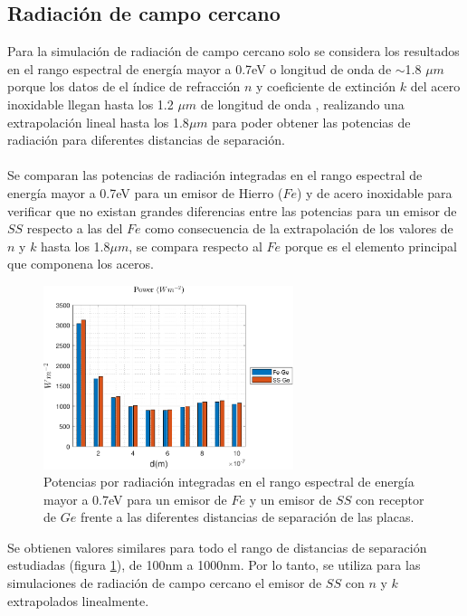 \subsection{Radiación de campo cercano}
Para la simulación de radiación de campo cercano solo se considera los resultados en el rango espectral de energía mayor a 0.7eV o longitud de onda de $\sim$1.8 $\mu m$ porque los datos de el índice de refracción $n$ y coeficiente de extinción $k$ del acero inoxidable llegan hasta los 1.2 $\mu m$ de longitud de onda \cite{ss_optical_2017}, realizando una extrapolación lineal hasta los 1.8$\mu m$ para poder obtener las potencias de radiación para diferentes distancias de separación.\\\\
Se comparan las potencias de radiación integradas en el rango espectral de energía mayor a 0.7eV para un emisor de Hierro ($Fe$) y de acero inoxidable para verificar que no existan grandes diferencias entre las potencias para un emisor de $SS$ respecto a las del $Fe$ como consecuencia de la extrapolación de los valores de $n$ y $k$ hasta los 1.8$\mu m$, se compara respecto al $Fe$ porque es el elemento principal que componena  los aceros.
\begin{figure}[H]
	\centering
		\includegraphics[width=0.65\textwidth]{figuras/rad_mat/FevsSs.pdf}
	\caption{Potencias por radiación integradas en el rango espectral de energía mayor a 0.7eV para un emisor de $Fe$ y un emisor de $SS$ con receptor de $Ge$ frente a las diferentes distancias de separación de las placas.}
	\label{fig:FevsSs}
\end{figure}
Se obtienen valores similares para todo el rango de distancias de separación estudiadas (figura \ref{fig:FevsSs}), de 100nm a 1000nm. Por lo tanto, se utiliza para las simulaciones de radiación de campo cercano el emisor de $SS$ con $n$ y $k$ extrapolados linealmente.\\\\

